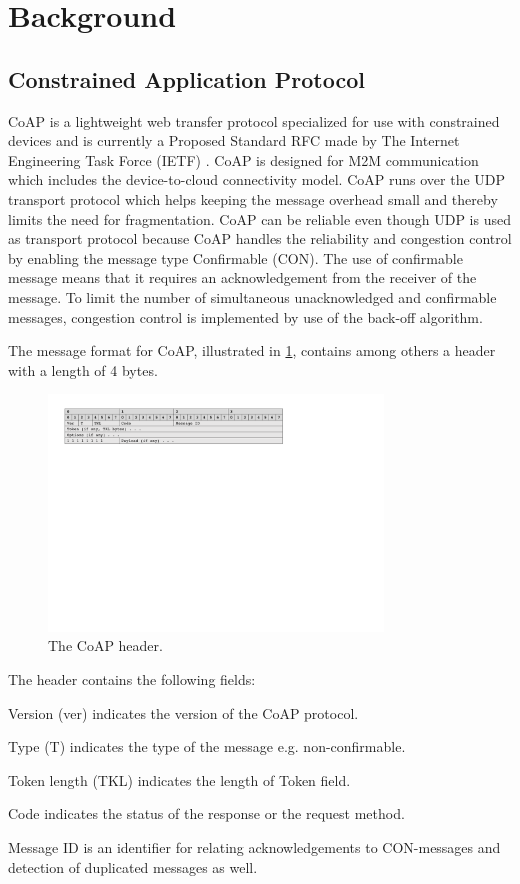 \section{Background}\label{sec:background}

\subsection{Constrained Application Protocol}
CoAP is a lightweight web transfer protocol specialized for use with constrained devices and is currently a Proposed Standard RFC made by The Internet Engineering Task Force (IETF) \cite{Inter93:online}. CoAP is designed for M2M communication which includes the device-to-cloud connectivity model.
CoAP runs over the UDP transport protocol which helps keeping the message overhead small and thereby limits the need for fragmentation.
CoAP can be reliable even though UDP is used as transport protocol because CoAP handles the reliability and congestion control by enabling the message type Confirmable (CON). 
The use of confirmable message means that it requires an acknowledgement from the receiver of the message. 
To limit the number of simultaneous unacknowledged and confirmable messages, congestion control is implemented by use of the back-off algorithm.

The message format for CoAP, illustrated in \figurename{\ref{fig:msgformatcoap}}, contains among others a header with a length of 4 bytes. 
\begin{figure}[bht]
	\centering
	\includegraphics[width=3.5in]{gfx/msgformat-coap}
	\caption{The CoAP header.}
	\label{fig:msgformatcoap}
\end{figure}

The header contains the following fields: 
\begin{list}{-}{}
	\item Version (ver) indicates the version of the CoAP protocol.
	\item Type (T) indicates the type of the message e.g. non-confirmable.
	\item Token length (TKL) indicates the length of Token field.
	\item Code indicates the status of the response or the request method. 
	\item Message ID is an identifier for relating acknowledgements to CON-messages and detection of duplicated messages as well.
\end{list}

